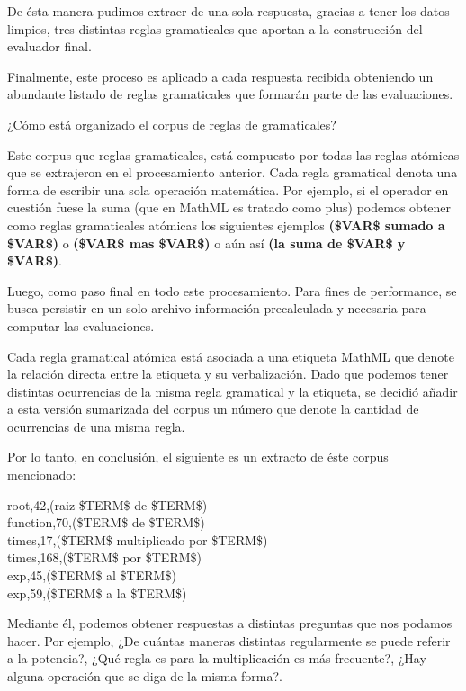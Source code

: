 De ésta manera pudimos extraer de una sola respuesta, gracias a tener los datos limpios, tres distintas reglas gramaticales que aportan a la construcción del evaluador final.

Finalmente, este proceso es aplicado a cada respuesta recibida obteniendo un abundante listado de reglas gramaticales que formarán parte de las evaluaciones.

¿Cómo está organizado el corpus de reglas de gramaticales?

Este corpus que reglas gramaticales, está compuesto por todas las reglas atómicas que se extrajeron en el procesamiento anterior. Cada regla gramatical denota una forma de escribir una sola operación matemática. Por ejemplo, si el operador en cuestión fuese la suma (que en MathML es tratado como plus) podemos obtener como reglas gramaticales atómicas los siguientes ejemplos \textbf{(\$VAR\$ sumado a \$VAR\$)} o \textbf{(\$VAR\$ mas \$VAR\$)} o aún así \textbf{(la suma de \$VAR\$ y \$VAR\$)}.

Luego, como paso final en todo este procesamiento. Para fines de performance, se busca persistir en un solo archivo información precalculada y necesaria para computar las evaluaciones.

Cada regla gramatical atómica está asociada a una etiqueta MathML que denote la relación directa entre la etiqueta y su verbalización. Dado que podemos tener distintas ocurrencias de la misma regla gramatical y la etiqueta, se decidió añadir a esta versión sumarizada del corpus un número que denote la cantidad de ocurrencias de una misma regla.

Por lo tanto, en conclusión, el siguiente es un extracto de éste corpus mencionado:

\begin{tcolorbox}
root,42,(raiz \$TERM\$ de \$TERM\$)\\
function,70,(\$TERM\$ de \$TERM\$)\\
times,17,(\$TERM\$ multiplicado por \$TERM\$)\\
times,168,(\$TERM\$ por \$TERM\$)\\
exp,45,(\$TERM\$ al \$TERM\$)\\
exp,59,(\$TERM\$ a la \$TERM\$)
\end{tcolorbox}

Mediante él, podemos obtener respuestas a distintas preguntas que nos podamos hacer. Por ejemplo, ¿De cuántas maneras distintas regularmente se puede referir a la potencia?, ¿Qué regla es para la multiplicación es más frecuente?, ¿Hay alguna operación que se diga de la misma forma?.

